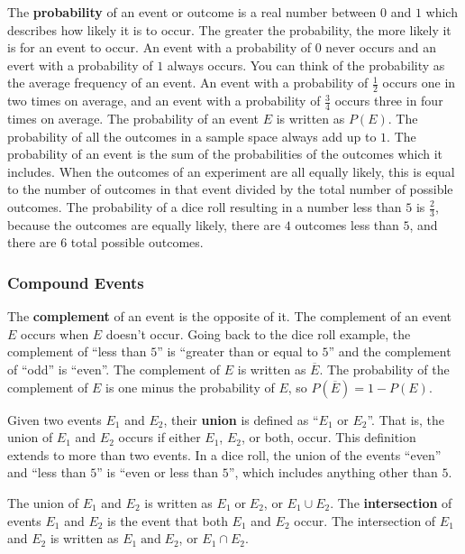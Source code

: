 \documentclass[twocolumn]{article}
\newcommand{\pand}{\mathop\text{and}}
\newcommand{\por}{\mathop\text{or}}
\begin{document}
The \textbf{probability} of an event or outcome is a real number between $0$
and $1$ which describes how likely it is to occur. The greater the
probability, the more likely it is for an event to occur. An event with a
probability of $0$ never occurs and an evert with a probability of $1$
always occurs. You can think of the probability as the average frequency of
an event. An event with a probability of $\frac{1}{2}$ occurs one in two
times on average, and an event with a probability of $\frac{3}{4}$ occurs
three in four times on average. The probability of an event $E$ is written
as $P(E)$. The probability of all the outcomes in a sample space always add
up to $1$. The probability of an event is the sum of the probabilities of
the outcomes which it includes. When the outcomes of an experiment are all
equally likely, this is equal to the number of outcomes in that event
divided by the total number of possible outcomes. The probability of a dice
roll resulting in a number less than $5$ is $\frac{2}{3}$, because the
outcomes are equally likely, there are $4$ outcomes less than $5$, and there
are $6$ total possible outcomes.

\subsubsection*{Compound Events}
The \textbf{complement} of an event is the opposite of it. The complement of
an event $E$ occurs when $E$ doesn't occur. Going back to the dice roll
example, the complement of ``less than $5$'' is ``greater than or equal to
$5$'' and the complement of ``odd'' is ``even''. The complement of $E$ is
written as $\overline{E}$. The probability of the complement of $E$ is one
minus the probability of $E$, so $P(\overline{E}) = 1 - P(E)$.

Given two events $E_1$ and $E_2$, their \textbf{union} is defined as ``$E_1$
or $E_2$''. That is, the union of $E_1$ and $E_2$ occurs if either $E_1$,
$E_2$, or both, occur. This definition extends to more than two events.  In
a dice roll, the union of the events ``even'' and ``less than $5$'' is
``even or less than $5$'', which includes anything other than $5$.

The union of $E_1$ and $E_2$ is written as $E_1 \por E_2$, or $E_1 \cup E_2$.
The \textbf{intersection} of events $E_1$ and $E_2$ is the event that both $E_1$
and $E_2$ occur. The intersection of $E_1$ and $E_2$ is written as $E_1 \pand
E_2$, or $E_1 \cap E_2$.
\end{document}

